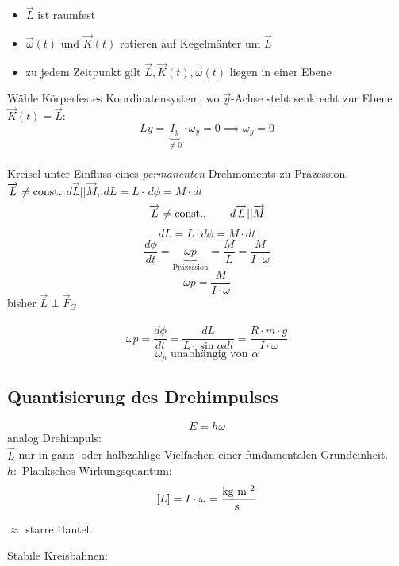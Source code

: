 \documentclass[a4paper,10pt]{scrartcl}
\begin{document}
\begin{sg}
 \begin{itemize}
  \item $\vec L$ ist raumfest
  \item $\vec \omega (t)$ und $\vec K(t)$ rotieren auf Kegelmänter um $\vec L$
  \item zu jedem Zeitpunkt gilt $\vec L, \vec K(t), \vec \omega(t)$ liegen in einer Ebene
 \end{itemize}
Wähle Körperfestes Koordinatensystem, wo $\vec y$-Achse steht senkrecht zur Ebene $\vec K(t)=\vec L$:
\[
 Ly=\underbrace{I_{y}}_{\neq 0} \cdot \omega_y = 0 \implies \omega_y=0
\]
\\
Kreisel unter Einfluss eines \emph{permanenten} Drehmoments zu Präzession.\\
$\overrightarrow{L} \neq \text{const}.$ $d\vec L || \vec M$, $dL=L\cdot \, d\phi=M\cdot dt$
\[
 \overrightarrow{L} \neq \text{const}., \qquad d\overrightarrow{L} ||\overrightarrow{M} 
\]
\[
 \boxed{dL=L\cdot d\phi=M\cdot dt}
\]
\[
 \frac{d\phi}{dt}=\underbrace{\omega p}_{\text{Präzession}} = \frac{M}{L}=\frac{M}{I\cdot \omega}
\]
\[
 \boxed{\omega p=\frac{M}{I\cdot \omega}}
\]
bisher $\vec L \perp \vec F_G$\\
\\
\[
 \omega p=\frac{d\phi}{dt}=\frac{dL}{L\cdot \sin{\alpha} dt}=\frac{R\cdot m \cdot g}{I\cdot \omega}
\]
\[
 \omega_p \text{ unabhängig von $\alpha$} 
\]
\end{sg}
\subsection{Quantisierung des Drehimpulses}
\[
 E=h\omega
\]
analog Drehimpuls:\\
$\vec L$ nur in ganz- oder halbzahlige Vielfachen einer fundamentalen Grundeinheit.
\[
\]
$h:$ Planksches Wirkungsquantum:
\[
 [L]=I\cdot \omega= \frac{\text{kg } \text{m }^2}{\text{s }}
\]

\begin{ex}
 $\approx$ starre Hantel.\\
\end{ex}
\begin{ex}[Wasserstoffatome]
\end{ex}
Stabile Kreisbahnen:
\end{document}
